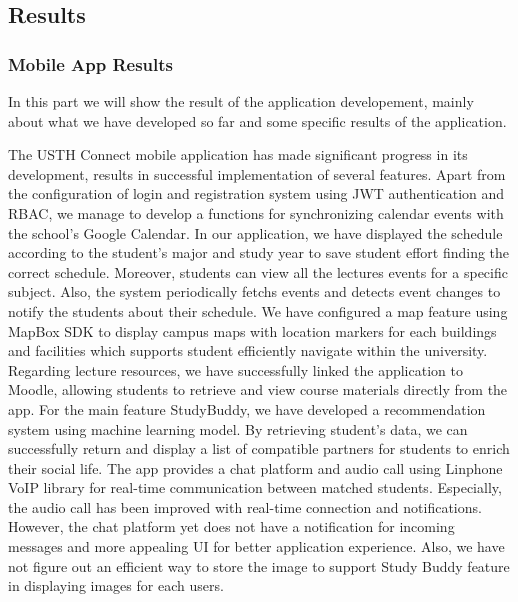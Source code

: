 \documentclass{article}
\makeatletter
\newcommand\subsubsubsection{\@startsection{paragraph}{4}{\z@}{-2.5ex\@plus -1ex \@minus -.25ex}{1.25ex \@plus .25ex}{\normalfont\normalsize\bfseries}}
\makeatother
\begin{document}
\subsection{Results}

\subsubsection{Mobile App Results}
In this part we will show the result of the application developement, mainly about what we have developed so far and some specific results of the application.

\subsubsubsection{Application Features Progress}
The USTH Connect mobile application has made significant progress in its development, results in successful implementation of several features.
Apart from the configuration of login and registration system using JWT authentication and RBAC, we manage to develop a functions for synchronizing calendar events with the school's Google Calendar.
In our application, we have displayed the schedule according to the student's major and study year to save student effort finding the correct schedule. 
Moreover, students can view all the lectures events for a specific subject. Also, the system periodically fetchs events and detects event changes to notify the students about their schedule.
We have configured a map feature using MapBox SDK to display campus maps with location markers for each buildings and facilities which supports student efficiently navigate within the university.
Regarding lecture resources, we have successfully linked the application to Moodle, allowing students to retrieve and view course materials directly from the app.
For the main feature StudyBuddy, we have developed a recommendation system using machine learning model. By retrieving student's data, we can successfully return and display a list of compatible partners for students to enrich their social life.
The app provides a chat platform and audio call using Linphone VoIP library for real-time communication between matched students. Especially, the audio call has been improved with real-time connection and notifications. 
However, the chat platform yet does not have a notification for incoming messages and more appealing UI for better application experience.
Also, we have not figure out an efficient way to store the image to support Study Buddy feature in displaying images for each users. 
\end{document}
